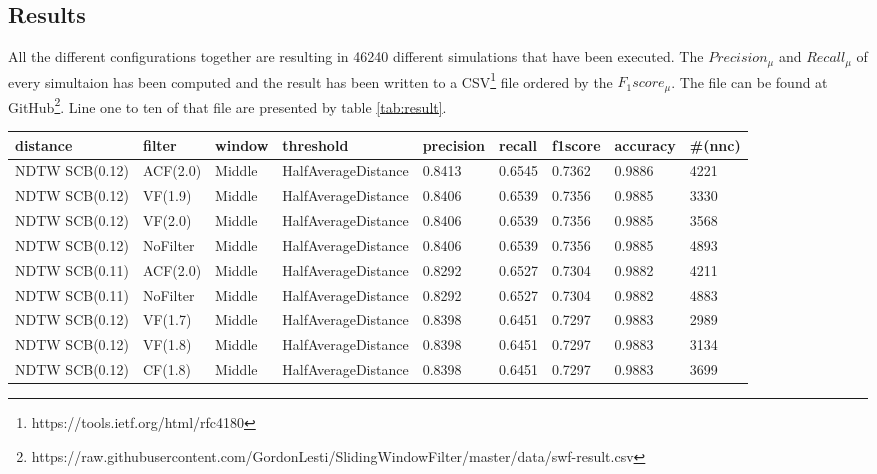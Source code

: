 \subsection{Results} \label{results}
All the different configurations together are resulting in 46240 different simulations that have been executed. The
$Precision_{\mu}$ and $Recall_{\mu}$ of every simultaion has been computed and the result has been written to a
CSV\footnote{https://tools.ietf.org/html/rfc4180} file ordered by the $F_{1}score_{\mu}$. The file can be found at
GitHub\footnote{https://raw.githubusercontent.com/GordonLesti/SlidingWindowFilter/master/data/swf-result.csv}. Line one
to ten of that file are presented by table \ref{tab:result}.

\begin{table}
    \begin{center}
        {\tiny
            \begin{tabular}{l l l l l l l l l}
                \textbf{distance} & \textbf{filter} & \textbf{window} & \textbf{threshold} & \textbf{precision} & \textbf{recall} & \textbf{f1score} & \textbf{accuracy} & \textbf{\#(nnc)}\\
                \hline
                NDTW SCB(0.12) & ACF(2.0) & Middle  & HalfAverageDistance & 0.8413 & 0.6545 & 0.7362 & 0.9886 & 4221\\
                NDTW SCB(0.12) & VF(1.9) & Middle  & HalfAverageDistance & 0.8406 & 0.6539 & 0.7356 & 0.9885 & 3330\\
                NDTW SCB(0.12) & VF(2.0) & Middle  & HalfAverageDistance & 0.8406 & 0.6539 & 0.7356 & 0.9885 & 3568\\
                NDTW SCB(0.12) & NoFilter & Middle  & HalfAverageDistance & 0.8406 & 0.6539 & 0.7356 & 0.9885 & 4893\\
                NDTW SCB(0.11) & ACF(2.0) & Middle  & HalfAverageDistance & 0.8292 & 0.6527 & 0.7304 & 0.9882 & 4211\\
                NDTW SCB(0.11) & NoFilter & Middle & HalfAverageDistance & 0.8292 & 0.6527 & 0.7304 & 0.9882 & 4883\\
                NDTW SCB(0.12) & VF(1.7) & Middle & HalfAverageDistance & 0.8398 & 0.6451 & 0.7297 & 0.9883 & 2989\\
                NDTW SCB(0.12) & VF(1.8) & Middle & HalfAverageDistance & 0.8398 & 0.6451 & 0.7297 & 0.9883 & 3134\\
                NDTW SCB(0.12) & CF(1.8) & Middle & HalfAverageDistance & 0.8398 & 0.6451 & 0.7297 & 0.9883 & 3699\\

\end{tabular}}
\end{center}
\end{table}

